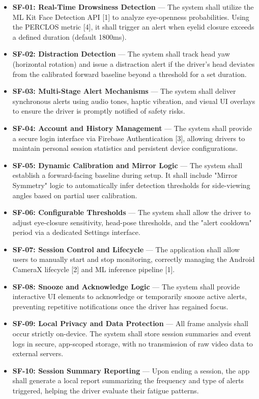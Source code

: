 \documentclass[11pt]{report}
\begin{document}
\begin{itemize}
    \item \textbf{SF-01: Real-Time Drowsiness Detection} —
    The system shall utilize the ML Kit Face Detection API [1] to analyze eye-openness probabilities. Using the PERCLOS metric [4], it shall trigger an alert when eyelid closure exceeds a defined duration (default 1800ms).

    \item \textbf{SF-02: Distraction Detection} —
    The system shall track head yaw (horizontal rotation) and issue a distraction alert if the driver's head deviates from the calibrated forward baseline beyond a threshold for a set duration.

    \item \textbf{SF-03: Multi-Stage Alert Mechanisms} —
    The system shall deliver synchronous alerts using audio tones, haptic vibration, and visual UI overlays to ensure the driver is promptly notified of safety risks.

    \item \textbf{SF-04: Account and History Management} —
    The system shall provide a secure login interface via Firebase Authentication [3], allowing drivers to maintain personal session statistics and persistent device configurations.

    \item \textbf{SF-05: Dynamic Calibration and Mirror Logic} —
    The system shall establish a forward-facing baseline during setup. It shall include "Mirror Symmetry" logic to automatically infer detection thresholds for side-viewing angles based on partial user calibration.

    \item \textbf{SF-06: Configurable Thresholds} —
    The system shall allow the driver to adjust eye-closure sensitivity, head-pose thresholds, and the "alert cooldown" period via a dedicated Settings interface.

    \item \textbf{SF-07: Session Control and Lifecycle} —
    The application shall allow users to manually start and stop monitoring, correctly managing the Android CameraX lifecycle [2] and ML inference pipeline [1].

    \item \textbf{SF-08: Snooze and Acknowledge Logic} —
    The system shall provide interactive UI elements to acknowledge or temporarily snooze active alerts, preventing repetitive notifications once the driver has regained focus.

    \item \textbf{SF-09: Local Privacy and Data Protection} —
    All frame analysis shall occur strictly on-device. The system shall store session summaries and event logs in secure, app-scoped storage, with no transmission of raw video data to external servers.

    \item \textbf{SF-10: Session Summary Reporting} —
    Upon ending a session, the app shall generate a local report summarizing the frequency and type of alerts triggered, helping the driver evaluate their fatigue patterns.
\end{itemize}
\end{document}

